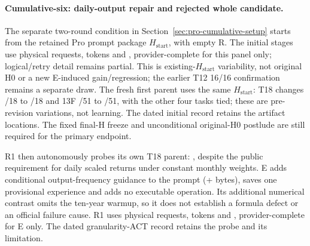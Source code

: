 \paragraph{Cumulative-six: daily-output repair and rejected whole candidate.}
The separate two-round condition in Section~\ref{sec:pro-cumulative-setup}
starts from the retained Pro prompt package $H_{\mathrm{start}}$, with empty R.
 The \ProCumulativeInitialStages{} initial stages use
\ProCumulativeInitialRequests{} physical requests,
\ProCumulativeInitialTokens{} tokens and \ProCumulativeInitialCost{},
provider-complete for this panel only; logical/retry detail remains partial.
This is existing-$H_{\mathrm{start}}$ variability, not original H0 or a new E-induced
gain/regression; the earlier T12 16/16 confirmation remains a separate draw.
The fresh first parent uses the same $H_{\mathrm{start}}$: T18 changes
\ProCumulativeInitialTEighteenPassed{}/18 to
\ProCumulativeRoneParentTEighteenPassed{}/18 and 13F
\ProCumulativeInitialThirteenFPassed{}/51 to
\ProCumulativeRoneParentThirteenFPassed{}/51, with the other four tasks tied;
these are pre-revision variations, not learning.
The dated initial record retains the artifact locations. The fixed final-H
freeze and unconditional original-H0 postlude are still required for the
primary endpoint.

R1 then autonomously probes its own T18 parent: , despite
the public requirement for daily scaled returns under constant monthly
weights. E adds conditional output-frequency guidance to the prompt
(+\ProCumulativeRonePromptAddedBytes{} bytes), saves one provisional experience
and adds no executable operation. Its additional numerical contrast omits the
ten-year warmup, so it does not establish a formula defect or an official
failure cause. R1 uses \ProCumulativeRoneRequests{} physical requests,
\ProCumulativeRoneTokens{} tokens and \ProCumulativeRoneCost{},
provider-complete for E only. The dated granularity-ACT record retains the
probe and its limitation.


